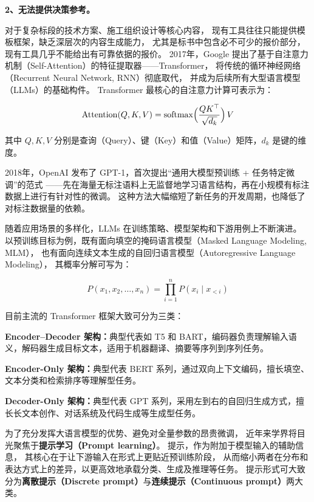 \documentclass{xmu}
\begin{document}
{\bf 2、无法提供决策参考。}

对于复杂标段的技术方案、施工组织设计等核心内容，
现有工具往往只能提供模板框架，缺乏深层次的内容生成能力，
尤其是标书中包含必不可少的报价部分，
现有工具几乎不能给出有可靠依据的报价。
2017年，Google 提出了基于自注意力机制（Self-Attention）的特征提取器——Transformer，
将传统的循环神经网络（Recurrent Neural Network, RNN）彻底取代，
并成为后续所有大型语言模型（LLMs）的基础构件。
Transformer 最核心的自注意力计算可表示为：

$$
\mathrm{Attention}(Q,K,V) = \mathrm{softmax}\Bigl(\frac{QK^\top}{\sqrt{d_k}}\Bigr)\,V
$$

其中 $Q, K, V$ 分别是查询（Query）、键（Key）和值（Value）矩阵，$d_k$ 是键的维度。

2018年，OpenAI 发布了 GPT-1，首次提出“通用大模型预训练 + 任务特定微调”的范式
——先在海量无标注语料上无监督地学习语言结构，再在小规模有标注数据上进行有针对性的微调。
这种方法大幅缩短了新任务的开发周期，也降低了对标注数据量的依赖。

随着应用场景的多样化，LLMs 在训练策略、模型架构和下游用例上不断演进。
以预训练目标为例，既有面向填空的掩码语言模型（Masked Language Modeling, MLM），
也有面向连续文本生成的自回归语言模型（Autoregressive Language Modeling），
其概率分解可写为：

$$
P(x_1, x_2, \dots, x_n) = \prod_{i=1}^n P(x_i \mid x_{<i})
$$

目前主流的 Transformer 框架大致可分为三类：

{\bf Encoder–Decoder 架构：}典型代表如 T5 和 BART，编码器负责理解输入语义，解码器生成目标文本，适用于机器翻译、摘要等序列到序列任务。

{\bf Encoder-Only 架构：}典型代表 BERT 系列，通过双向上下文编码，擅长填空、文本分类和检索排序等理解型任务。

{\bf Decoder-Only 架构：}典型代表 GPT 系列，采用左到右的自回归生成方式，擅长长文本创作、对话系统及代码生成等生成型任务。


为了充分发挥大语言模型的优势、避免对全量参数的昂贵微调，
近年来学界将目光聚焦于{\bf 提示学习（Prompt learning）}。
提示，作为附加于模型输入的辅助信息，
其核心在于让下游输入在形式上更贴近预训练阶段，
从而缩小两者在分布和表达方式上的差异，以更高效地承载分类、生成及推理等任务。
提示形式可大致分为{\bf 离散提示（Discrete prompt）}与{\bf 连续提示（Continuous prompt）}两大类。
\end{document}
